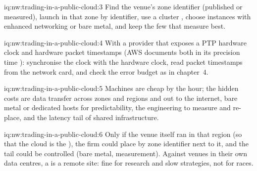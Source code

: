 \begin{solution}{iq:nw:trading-in-a-public-cloud:3}
Find the venue's zone identifier (published or measured), launch in that zone by identifier, use a cluster , choose instances with
enhanced networking or bare metal, and keep the few that measure best.
\end{solution}

\begin{solution}{iq:nw:trading-in-a-public-cloud:4}
With a provider that exposes a PTP hardware clock and hardware packet timestamps (AWS documents both in its precision time ):
synchronise the clock with the hardware clock, read packet timestamps from the network card, and check the error budget as in chapter~4.
\end{solution}

\begin{solution}{iq:nw:trading-in-a-public-cloud:5}
Machines are cheap by the hour; the hidden costs are data transfer across zones and regions and out to the internet, bare metal or dedicated hosts
for predictability, the engineering to measure and re-place, and the latency tail of shared infrastructure.
\end{solution}

\begin{solution}{iq:nw:trading-in-a-public-cloud:6}
Only if the venue itself ran in that region (so that the cloud is the ), the firm could place by zone identifier next to it, and the tail
could be controlled (bare metal, measurement). Against venues in their own data centres, a  is a remote site: fine for research and
slow strategies, not for races.
\end{solution}
